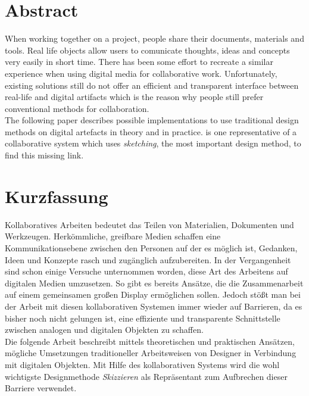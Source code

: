 \begingroup
\let\clearpage\relax
\let\cleardoublepage\relax
\let\cleardoublepage\relax

\chapter*{Abstract}
When working together on a project, people share their documents, materials and tools. Real life objects allow users to comunicate thoughts, ideas and concepts very easily in short time. There has been some effort to recreate a similar experience when using digital media for collaborative work. Unfortunately, existing solutions still do not offer an efficient and transparent interface between real-life and digital artifacts which is the reason why people still prefer conventional methods for collaboration. \\
The following paper describes possible implementations to use traditional design methods on digital artefacts in theory and in practice. \scribbler is one representative of a collaborative system which uses \emph{sketching}, the most important design method, to find this missing link.

\vfill

\chapter*{Kurzfassung}
Kollaboratives Arbeiten bedeutet das Teilen von Materialien, Dokumenten und Werkzeugen. Herkömmliche, greifbare Medien schaffen eine Kommunikationsebene zwischen den Personen auf der es möglich ist, Gedanken, Ideen und Konzepte rasch und zugänglich aufzubereiten. In der Vergangenheit sind schon einige Versuche unternommen worden, diese Art des Arbeitens auf digitalen Medien umzusetzen. So gibt es bereits Ansätze, die die Zusammenarbeit auf einem gemeinsamen großen Display ermöglichen sollen. Jedoch stößt man bei der Arbeit mit diesen kollaborativen Systemen immer wieder auf Barrieren, da es bisher noch nicht gelungen ist, eine effiziente und transparente Schnittstelle zwischen analogen und digitalen Objekten zu schaffen.\\
Die folgende Arbeit beschreibt mittels theoretischen und praktischen Ansätzen, mögliche Umsetzungen traditioneller Arbeitsweisen von Designer in Verbindung mit digitalen Objekten. Mit Hilfe des kollaborativen Systems \scribbler wird die wohl wichtigste Designmethode \emph{Skizzieren} als Repräsentant zum Aufbrechen dieser Barriere verwendet.

\endgroup			

\vfill